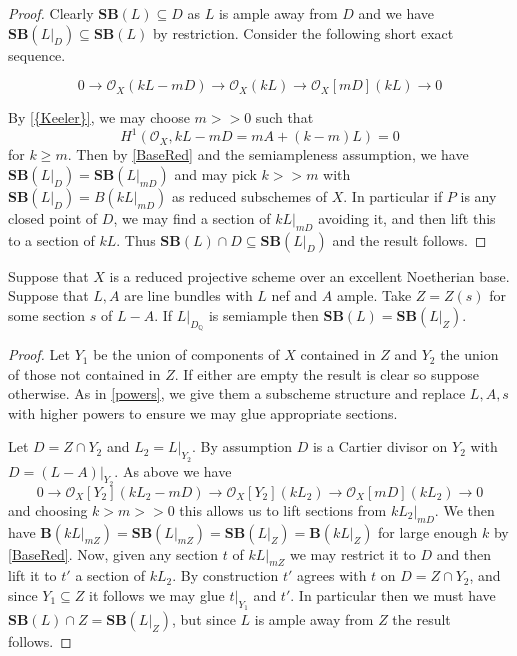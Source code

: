 \documentclass[a4paper,12pt]{book}
\newcommand{\SB}{\mathbf{SB}}
\newcommand{\BB}{\mathbf{B}}
\newcommand{\ox}{\mathcal{O}_{X}}
\begin{document}
\begin{proof}
	Clearly $\SB(L) \subseteq D$ as $L$ is ample away from $D$ and we have $\SB(L|_{D}) \subseteq \SB(L)$ by restriction. Consider the following short exact sequence.
	
	\[0 \to \ox (kL-mD) \to \ox(kL) \to \ox[mD](kL) \to 0\]
	
	By \autoref{{Keeler}}, we may choose $m >>0$ such that $$H^{1}(\ox,kL-mD=mA+(k-m)L)=0$$ for $k \geq m$. Then by \autoref{BaseRed} and the semiampleness assumption, we have $\SB(L|_{D})=\SB(L|_{mD})$ and may pick $k>> m$ with $\SB(L|_{D})=B(kL|_{mD})$ as reduced subschemes of $X$. In particular if $P$ is any closed point of $D$, we may find a section of $kL|_{mD}$ avoiding it, and then lift this to a section of $kL$. Thus $\SB(L)\cap D \subseteq \SB(L|_{D}) $ and the result follows.

\end{proof}


\begin{lemma}
	Suppose that $X$ is a reduced projective scheme over an excellent Noetherian base. Suppose that $L,A$ are line bundles with $L$ nef and $A$ ample. Take $Z=Z(s)$ for some section $s$ of $L-A$. If $L|_{D_{\mathbb{Q}}}$ is semiample then $\SB(L)=\SB(L|_{Z})$.
\end{lemma}

\begin{proof}
	Let $Y_{1}$ be the union of components of $X$ contained in $Z$ and $Y_{2}$ the union of those not contained in $Z$. If either are empty the result is clear so suppose otherwise. As in \autoref{powers}, we give them a subscheme structure and replace $L,A,s$ with higher powers to ensure we may glue appropriate sections.
	
	Let $D=Z \cap Y_{2}$ and $L_{2}=L|_{Y_{2}}$. By assumption $D$ is a Cartier divisor on $Y_{2}$ with $D=(L-A)|_{Y_{2}}$. As above we have 
	\[0 \to \ox[Y_{2}] (kL_{2}-mD) \to \ox[Y_{2}](kL_{2}) \to \ox[mD](kL_{2}) \to 0\]
	and choosing $k > m >>0$ this allows us to lift sections from $kL_{2}|_{mD}$. We then have $\BB(kL|_{mZ})=\SB(L|_{mZ})=\SB(L|_{Z})= \BB(kL|_{Z})$ for large enough $k$ by \autoref{BaseRed}. Now, given any section $t$ of $kL|_{mZ}$ we may restrict it to $D$ and then lift it to $t'$ a section of $kL_{2}$. By construction $t'$ agrees with $t$ on $D=Z \cap Y_{2}$, and since $Y_{1} \subseteq Z$ it follows we may glue $t|_{Y_{1}}$ and $t'$. In particular then we must have $\SB(L)\cap Z = \SB(L|_{Z})$, but since $L$ is ample away from $Z$ the result follows.
\end{proof}
\end{document}
